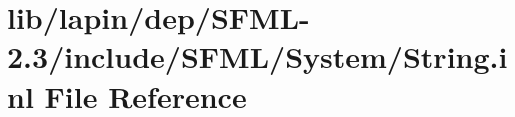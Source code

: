 \hypertarget{lapin_2dep_2_s_f_m_l-2_83_2include_2_s_f_m_l_2_system_2_string_8inl}{\section{lib/lapin/dep/\-S\-F\-M\-L-\/2.3/include/\-S\-F\-M\-L/\-System/\-String.inl File Reference}
\label{lapin_2dep_2_s_f_m_l-2_83_2include_2_s_f_m_l_2_system_2_string_8inl}
}
